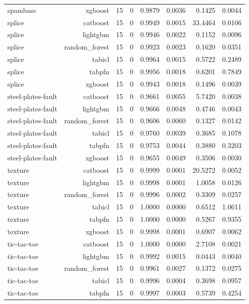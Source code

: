 \begin{table}[htbp]
\begin{tabular}{lrrrrrrr}
spambase & xgboost & 15 & 0 & 0.9879 & 0.0036 & 0.1425 & 0.0044 \\
splice & catboost & 15 & 0 & 0.9949 & 0.0015 & 33.4464 & 0.0106 \\
splice & lightgbm & 15 & 0 & 0.9946 & 0.0022 & 0.1152 & 0.0096 \\
splice & random\_forest & 15 & 0 & 0.9923 & 0.0023 & 0.1620 & 0.0351 \\
splice & tabicl & 15 & 0 & 0.9964 & 0.0015 & 0.5722 & 0.2489 \\
splice & tabpfn & 15 & 0 & 0.9956 & 0.0018 & 0.6201 & 0.7849 \\
splice & xgboost & 15 & 0 & 0.9943 & 0.0018 & 0.1496 & 0.0039 \\
steel-plates-fault & catboost & 15 & 0 & 0.9661 & 0.0055 & 5.7420 & 0.0038 \\
steel-plates-fault & lightgbm & 15 & 0 & 0.9666 & 0.0048 & 0.4746 & 0.0043 \\
steel-plates-fault & random\_forest & 15 & 0 & 0.9606 & 0.0060 & 0.1327 & 0.0142 \\
steel-plates-fault & tabicl & 15 & 0 & 0.9760 & 0.0039 & 0.3685 & 0.1078 \\
steel-plates-fault & tabpfn & 15 & 0 & 0.9753 & 0.0044 & 0.3880 & 0.3203 \\
steel-plates-fault & xgboost & 15 & 0 & 0.9655 & 0.0049 & 0.3506 & 0.0030 \\
texture & catboost & 15 & 0 & 0.9999 & 0.0001 & 20.5272 & 0.0052 \\
texture & lightgbm & 15 & 0 & 0.9998 & 0.0001 & 1.0058 & 0.0126 \\
texture & random\_forest & 15 & 0 & 0.9996 & 0.0002 & 0.3309 & 0.0257 \\
texture & tabicl & 15 & 0 & 1.0000 & 0.0000 & 0.6512 & 1.0611 \\
texture & tabpfn & 15 & 0 & 1.0000 & 0.0000 & 0.5267 & 0.9355 \\
texture & xgboost & 15 & 0 & 0.9998 & 0.0001 & 0.6907 & 0.0062 \\
tic-tac-toe & catboost & 15 & 0 & 1.0000 & 0.0000 & 2.7108 & 0.0021 \\
tic-tac-toe & lightgbm & 15 & 0 & 0.9992 & 0.0015 & 0.0443 & 0.0040 \\
tic-tac-toe & random\_forest & 15 & 0 & 0.9961 & 0.0027 & 0.1372 & 0.0275 \\
tic-tac-toe & tabicl & 15 & 0 & 0.9996 & 0.0004 & 0.3698 & 0.0957 \\
tic-tac-toe & tabpfn & 15 & 0 & 0.9997 & 0.0003 & 0.5739 & 0.4254 \\

\end{tabular}
\end{table}

